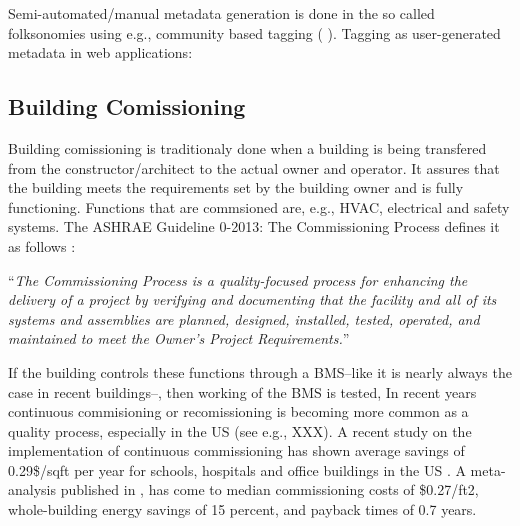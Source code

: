 Semi-automated/manual metadata generation is done in the so called folksonomies using e.g., community based tagging (\cite{Mathes2004} \cite{Golder2006}).
Tagging as user-generated metadata in web applications: \cite{budura2008tag}



\subsection{Building Comissioning} %
\label{sub:building_comissioning}
Building comissioning is traditionaly done when a building is being transfered from the constructor/architect to the actual owner and operator. It assures that the building meets the requirements set by the building owner and is fully functioning. Functions that are commsioned are, e.g., HVAC, electrical and safety systems.
The ASHRAE Guideline 0-2013: The Commissioning Process defines it as follows \cite{ASHRAE:2013aa}:

``\emph{The Commissioning Process is a quality-focused process for enhancing the delivery of a project by verifying and documenting that the facility and all of its systems and assemblies are planned, designed, installed, tested, operated, and maintained to meet the Owner's Project Requirements.}''

If the building controls these functions through a BMS--like it is nearly always the case in recent buildings--, then working of the BMS is tested, 
In recent years continuous commisioning or recomissioning is becoming more common as a quality process, especially in the US (see e.g., XXX).
A recent study on the implementation of continuous commissioning has shown average savings of 0.29\$/sqft per year for schools, hospitals and office buildings in the US \cite{oh2014implemented}.
A meta-analysis published in \cite{mills2004cost}, has come to median commissioning costs of \$0.27/ft2, whole-building energy savings of 15 percent, and payback times of 0.7 years.